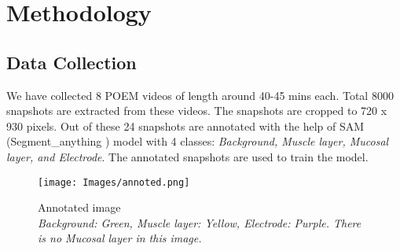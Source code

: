 \section{Methodology}
\label{sec:Methodology}

\subsection{Data Collection}
We have collected 8 POEM videos of length around 40-45 mins each. Total 8000 snapshots are extracted from these videos. The snapshots are cropped to 720 x 930 pixels. Out of these 24 snapshots are annotated with the help of SAM (Segment\_anything \cite{sam-model})  model with 4 classes: \textit{Background, Muscle layer, Mucosal layer, and Electrode}. The annotated snapshots are used to train the model.

\begin{figure}[h]
    \centering
    \texttt{[image: Images/annoted.png]}
    \caption{Annotated image \\ \textit{Background: Green, Muscle layer: Yellow, Electrode: Purple. There is no Mucosal layer in this image.}}
    \label{fig:annotated}
\end{figure}
